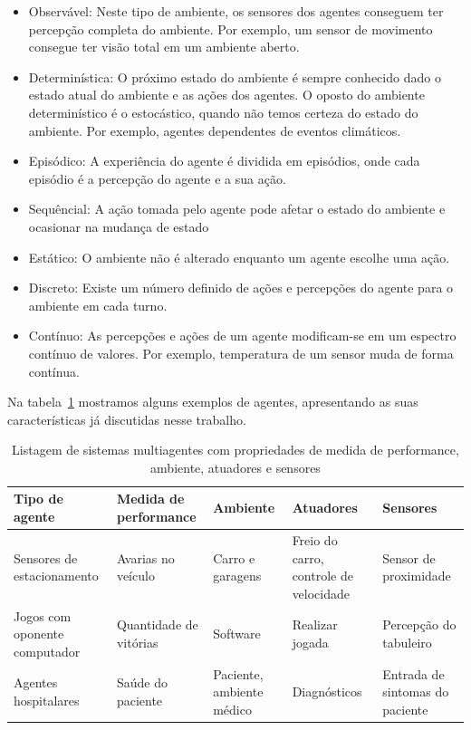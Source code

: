 \begin{itemize}
	\item Observável: Neste tipo de ambiente, os sensores dos agentes conseguem ter percepção completa do ambiente. Por exemplo, um sensor de movimento consegue ter visão total em um ambiente aberto.
	\item Determinística: O próximo estado do ambiente é sempre conhecido dado o estado atual do ambiente e as ações dos agentes. O oposto do ambiente determinístico é o estocástico, quando não temos certeza do estado do ambiente. Por exemplo, agentes dependentes de eventos climáticos.
	\item Episódico: A experiência do agente é dividida em episódios, onde cada episódio é a percepção do agente e a sua ação.
	\item Sequêncial: A ação tomada pelo agente pode afetar o estado do ambiente e ocasionar na mudança de estado
	\item Estático: O ambiente não é alterado enquanto um agente escolhe uma ação.
	\item Discreto: Existe um número definido de ações e percepções do agente para o ambiente em cada turno.
	\item Contínuo: As percepções e ações de um agente modificam-se em um espectro contínuo de valores. Por exemplo, temperatura de um sensor muda de forma contínua.
\end{itemize}

Na tabela~\ref{lista_agentes} mostramos alguns exemplos de agentes, apresentando as suas características já discutidas nesse trabalho.

\begin{table}
	\caption{Listagem de sistemas multiagentes com propriedades de medida de performance, ambiente, atuadores e sensores}
	\begin{tabular}{|p{3cm} | p{3cm} | p{2cm}| p{3cm} | p{3cm} |}
		\hline
		\textbf{Tipo de agente}	& \textbf{Medida de performance} & \textbf{Ambiente} & \textbf{Atuadores}  & \textbf{Sensores}	\\
		\hline
		Sensores de estacionamento	& Avarias no veículo & Carro e garagens & Freio do carro, controle de velocidade & Sensor de proximidade	\\
		\hline
		Jogos com oponente computador	& Quantidade de vitórias &	Software & Realizar jogada & Percepção do tabuleiro	\\
		\hline
		Agentes hospitalares		& Saúde do paciente & Paciente, ambiente médico & Diagnósticos & Entrada de sintomas do paciente	\\
		\hline
	\end{tabular}
	\label{lista_agentes}
\end{table}
 
